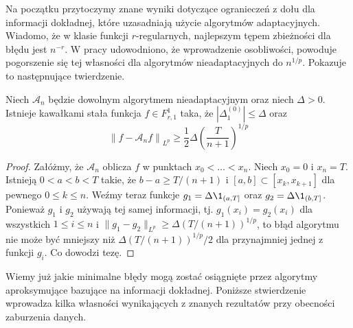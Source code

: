 \documentclass[oik, pdftex, robocza, man]{mgrwms}
\begin{document}
    Na początku przytoczymy znane wyniki dotyczące ogranieczeń z dołu dla informacji dokładnej, które uzasadniają użycie algorytmów adaptacyjnych. Wiadomo, że w klasie funkcji $r$-regularnych, najlepszym tępem zbieżności dla błędu jest $n^{-r}$. W pracy \cite{PoA} udowodniono, że wprowadzenie osobliwości, powoduje pogorszenie się tej własności dla algorytmów nieadaptacyjnych do $n^{1/p}$. Pokazuje to następnujące twierdzenie.

    \begin{thm}
        Niech $\mathcal{A}_{n}$ będzie dowolnym algorytmem nieadaptacyjnym oraz niech $\Delta > 0$. Istnieje kawałkami stała funkcja $f \in F_{r, 1}^{1}$ taka, że $|\Delta_{1}^{(0)}| \leq \Delta$ oraz
        \begin{equation*}
            \left\| f - \mathcal{A}_{n}f \right\|_{L^{p}} \geq \frac{1}{2}\Delta \left( \frac{T}{n+1} \right)^{1/p}
        \end{equation*}
    \end{thm}
    \begin{proof}
        Załóżmy, że $\mathcal{A}_{n}$ oblicza $f$ w punktach $x_{0} < \ldots < x_{n}$. Niech $x_{0} = 0$ i $x_{n} = T$. Istnieją $0 < a < b < T$ takie, że $b-a \geq T/(n+1)$ i $[a,b] \subset [x_{k}, x_{k+1}]$ dla pewnego $0 \leq k \leq n$. Weźmy teraz funkcje $g_{1} = \Delta\1_{(a, T]}$ oraz $g_{2} = \Delta\1_{(b, T]}$. Ponieważ $g_{1}$ i $g_{2}$ używają tej samej informacji, tj. $g_{1}(x_{i}) = g_{2}(x_{i})$ dla wszystkich $1 \leq i \leq n$ i $\| g_{1} - g_{2} \|_{L^{p}} \geq \Delta(T / (n+1))^{1/p}$, to błąd algorytmu nie może być mniejszy niż $\Delta(T/(n+1))^{1/p} / 2$ dla przynajmniej jednej z funkcji $g_{i}$. Co dowodzi tezę.
    \end{proof}

    Wiemy już jakie minimalne błędy mogą zostać osiągnięte przez algorytmy aproksymujące bazujące na informacji dokładnej. Poniższe stwierdzenie wprowadza kilka własności wynikających z znanych rezultatów przy obecności zaburzenia danych.
\end{document}
